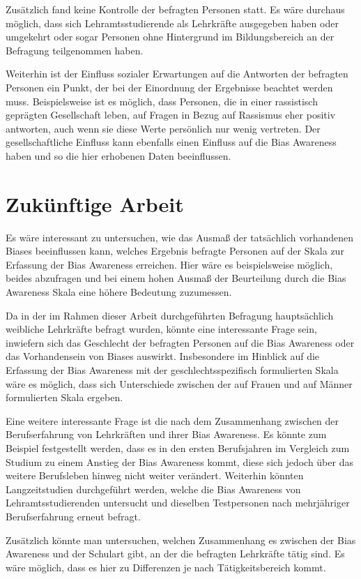 Zusätzlich fand keine Kontrolle der befragten Personen statt.
Es wäre durchaus möglich, dass sich Lehramtsstudierende als Lehrkräfte ausgegeben haben oder umgekehrt oder sogar Personen ohne Hintergrund im Bildungsbereich an der Befragung teilgenommen haben.

Weiterhin ist der Einfluss sozialer Erwartungen auf die Antworten der befragten Personen ein Punkt, der bei der Einordnung der Ergebnisse beachtet werden muss.
Beispielsweise ist es möglich, dass Personen, die in einer rassistisch geprägten Gesellschaft leben, auf Fragen in Bezug auf Rassismus eher positiv antworten, auch wenn sie diese Werte persönlich nur wenig vertreten.
Der gesellschaftliche Einfluss kann ebenfalls einen Einfluss auf die Bias Awareness haben und so die hier erhobenen Daten beeinflussen.


\section{Zukünftige Arbeit}
\label{sec:zukuenftige-arbeit}

Es wäre interessant zu untersuchen, wie das Ausmaß der tatsächlich vorhandenen Biases beeinflussen kann, welches Ergebnis befragte Personen auf der Skala zur Erfassung der Bias Awareness erreichen.
Hier wäre es beispielsweise möglich, beides abzufragen und bei einem hohen Ausmaß der Beurteilung durch die Bias Awareness Skala eine höhere Bedeutung zuzumessen.

Da in der im Rahmen dieser Arbeit durchgeführten Befragung hauptsächlich weibliche Lehrkräfte befragt wurden, könnte eine interessante Frage sein, inwiefern sich das Geschlecht der befragten Personen auf die Bias Awareness oder das Vorhandensein von Biases auswirkt.
Insbesondere im Hinblick auf die Erfassung der Bias Awareness mit der geschlechtsspezifisch formulierten Skala wäre es möglich, dass sich Unterschiede zwischen der auf Frauen und auf Männer formulierten Skala ergeben.

Eine weitere interessante Frage ist die nach dem Zusammenhang zwischen der Berufserfahrung von Lehrkräften und ihrer Bias Awareness.
Es könnte zum Beispiel festgestellt werden, dass es in den ersten Berufsjahren im Vergleich zum Studium zu einem Anstieg der Bias Awareness kommt, diese sich jedoch über das weitere Berufsleben hinweg nicht weiter verändert.
Weiterhin könnten Langzeitstudien durchgeführt werden, welche die Bias Awareness von Lehramtsstudierenden untersucht und dieselben Testpersonen nach mehrjähriger Berufserfahrung erneut befragt.

Zusätzlich könnte man untersuchen, welchen Zusammenhang es zwischen der Bias Awareness und der Schulart gibt, an der die befragten Lehrkräfte tätig sind.
Es wäre möglich, dass es hier zu Differenzen je nach Tätigkeitsbereich kommt.